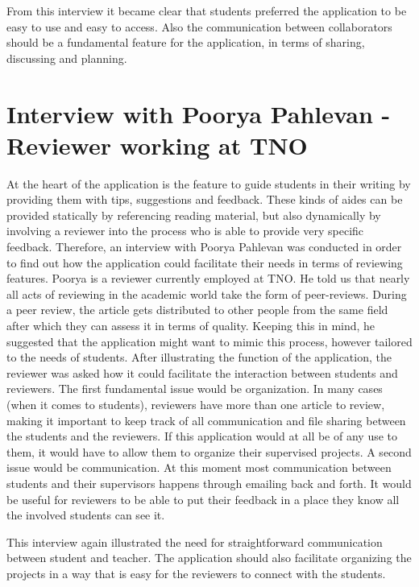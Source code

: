 From this interview it became clear that students preferred the application to be easy to use and easy to access. Also the communication between collaborators should be a fundamental feature for the application, in terms of sharing, discussing and planning. 

\section{Interview with Poorya Pahlevan - Reviewer working at TNO}
At the heart of the application is the feature to guide students in their writing by providing them with tips, suggestions and feedback. These kinds of aides can be provided statically by referencing reading material, but also dynamically by involving a reviewer into the process who is able to provide very specific feedback. Therefore, an interview with Poorya Pahlevan was conducted in order to find out how the application could facilitate their needs in terms of reviewing features. Poorya is a reviewer currently employed at TNO. He told us that nearly all acts of reviewing in the academic world take the form of peer-reviews. During a peer review, the article gets distributed to other people from the same field after which they can assess it in terms of quality. Keeping this in mind, he suggested that the application might want to mimic this process, however tailored to the needs of students. After illustrating the function of the application, the reviewer was asked how it could facilitate the interaction between students and reviewers. The first fundamental issue would be organization. In many cases (when it comes to students), reviewers have more than one article to review, making it important to keep track of all communication and file sharing between the students and the reviewers. If this application would at all be of any use to them, it would have to allow them to organize their supervised projects. A second issue would be communication. At this moment most communication between students and their supervisors happens through emailing back and forth. It would be useful for reviewers to be able to put their feedback in a place they know all the involved students can see it.

This interview again illustrated the need for straightforward communication between student and teacher. The application should also facilitate organizing the projects in a way that is easy for the reviewers to connect with the students.

